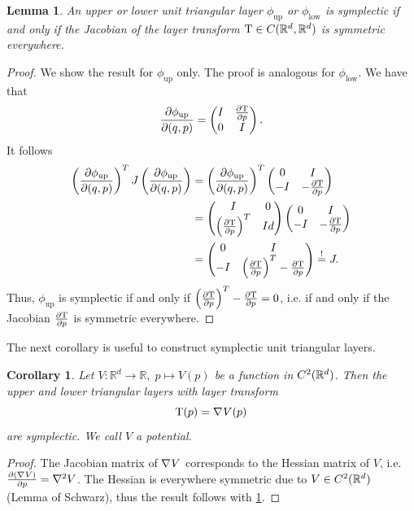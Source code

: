 \documentclass[twoside,a4paper]{article}
\newtheorem{corollary}{Corollary}
\newtheorem{lemma}{Lemma}
\begin{document}
\begin{lemma}\label{jacobi_symmetric}
	An upper or lower unit triangular layer $\phi_{\text{up}}$ or $\phi_{\text{low}}$
	is symplectic if and only if the Jacobian of the layer transform
	$\mathrm{T} \in C(\mathbb{R}^d, \mathbb{R}^d)$ 
	is symmetric everywhere.
\end{lemma}
\begin{proof}
	We show the result for $\phi_{\text{up}}$ only. 
	The proof is analogous for $\phi_{\text{low}}$.
	We have that
	\begin{equation*}
		\frac{\partial \phi_{\text{up}}}{\partial (q,p)} = \begin{pmatrix}
			I & \frac{\partial \mathrm{T}}{\partial p} \\
			0 & I
		\end{pmatrix}
		.
	\end{equation*}
	It follows
	\begin{align*}
		\left( \frac{\partial \phi_{\text{up}}}{\partial (q,p)} \right)^T J \left( \frac{\partial \phi_{\text{up}}}{\partial (q,p)} \right)
		&= \left( \frac{\partial \phi_{\text{up}}}{\partial (q,p)} \right)^T \begin{pmatrix}
			0 & I \\
			-I & -\frac{\partial \mathrm{T}}{\partial p}
		\end{pmatrix} \\
		&= \begin{pmatrix}
			I & 0 \\
			\left( \frac{\partial \mathrm{T}}{\partial p} \right)^T & Id
		\end{pmatrix} \begin{pmatrix}
			0 & I \\
			-I & -\frac{\partial \mathrm{T}}{\partial p}
		\end{pmatrix} \\
		&= \begin{pmatrix}
			0 & I \\
			-I & \left( \frac{\partial \mathrm{T}}{\partial p} \right) ^T-\frac{\partial \mathrm{T}}{\partial p}
		\end{pmatrix} \overset{!}{=} J
		.
	\end{align*}
	Thus, $\phi_{\text{up}}$ is symplectic if and only if
	$\left( \frac{\partial \mathrm{T}}{\partial p} \right) ^T-\frac{\partial \mathrm{T}}{\partial p}=0$, 
	i.e. if and only if the Jacobian $\frac{\partial \mathrm{T}}{\partial p}$ is symmetric everywhere.
\end{proof}

The next corollary is useful to construct symplectic unit triangular layers.
\begin{corollary}\label{gradient_corollary}
	Let $V: \mathbb{R}^d \to \mathbb{R}, \; p \mapsto V(p)$ be a function in 
	$C^2(\mathbb{R}^d)$. Then the upper and lower triangular layers with layer transform
	\begin{equation*}
		\mathrm{T}(p) = \nabla_{}{V}(p)
	\end{equation*}
	are symplectic. We call $V$ a potential.
\end{corollary}
\begin{proof}
	The Jacobian matrix of $\nabla_{}{V}$ corresponds to the Hessian matrix of $V$,
	i.e. $\frac{\partial (\nabla_{}{V})}{\partial p} =\nabla^2 V$.
	The Hessian is everywhere symmetric due to $V \in C^2(\mathbb{R}^d)$ (Lemma of Schwarz),
	thus the result follows with \cref{jacobi_symmetric}.
\end{proof}
\end{document}
